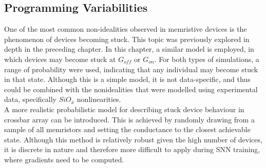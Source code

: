 

\subsection{Programming Variabilities}

One of the most common non-idealities observed in memristive devices is the phenomenon of devices becoming stuck. This topic was previously explored in depth in the preceding chapter. In this chapter, a similar model is employed, in which devices may become stuck at $G_{off}$ or $G_{on}$. For both types of simulations, a range of probability were used, indicating that any individual may become stuck in that state. Although this is a simple model, it is not data-specific, and thus could be combined with the nonidealities that were modelled using experimental data, specifically $SiO_x$ nonlinearities.\\

\noindent A more realistic probabilistic model for describing stuck device behaviour in crossbar array can be introduced. This is achieved by randomly drawing from a sample of all memristors and setting the conductance to the closest achievable state. Although this method is relatively robust given the high number of devices, it is discrete in nature and therefore more difficult to apply during SNN training, where gradients need to be computed. \\

